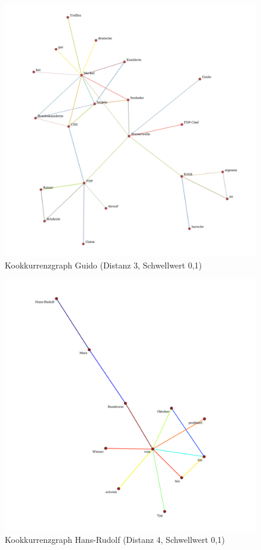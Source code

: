 \documentclass[11pt, a4paper]{article}
\begin{document}
\begin{figure}[hp!]
    \centering
        \includegraphics[scale=.4]{../../data/results/longpath_wordgraphs/den/graph_Guido.pdf}
    \caption{Kookkurrenzgraph Guido (Distanz 3, Schwellwert 0,1)}
\end{figure}

\begin{figure}[hp!]
    \centering
        \includegraphics[scale=.4]{../../data/results/longpath_wordgraphs/den/graph_HansRudolf.pdf}
    \caption{Kookkurrenzgraph Hans-Rudolf (Distanz 4, Schwellwert 0,1)}
\end{figure}
\end{document}
